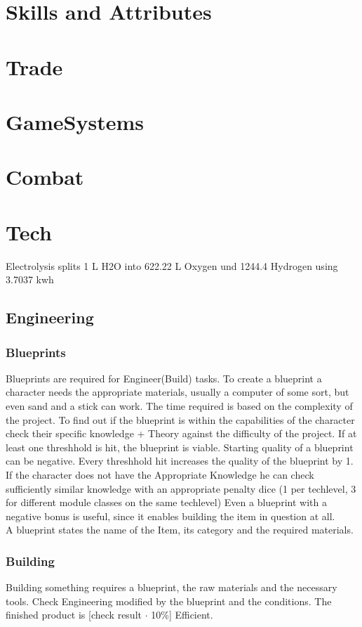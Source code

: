 \chapter{Skills and Attributes}\label{ch:skillsandattributes}



\chapter{Trade}\label{ch:trade}



\chapter{GameSystems}\label{ch:gamesystems}



\chapter{Combat}\label{ch:combat}


\chapter{Tech}\label{ch:tech}
Electrolysis splits 1 L H2O into 622.22 L Oxygen und 1244.4 Hydrogen using 3.7037 kwh\\
\section{Engineering}\label{sec:engineering}
\subsection{Blueprints}\label{subsec:blueprints}
Blueprints are required for Engineer(Build) tasks.
To create a blueprint a character needs the appropriate materials, usually a computer of some sort, but even sand and a
stick can work.
The time required is based on the complexity of the project.
To find out if the blueprint is within the capabilities of the character check their specific knowledge + Theory
against the difficulty of the project.
If at least one threshhold is hit, the blueprint is viable.
Starting quality of a blueprint can be negative.
Every threshhold hit increases the quality of the blueprint by 1.
If the character does not have the Appropriate Knowledge he can check sufficiently similar knowledge with
an appropriate penalty dice (1 per techlevel, 3 for different module classes on the same techlevel)
Even a blueprint with a negative bonus is useful, since it enables building the item in question at all.\\
A blueprint states the name of the Item, its category and the required materials.

\subsection{Building}\label{subsec:building}
Building something requires a blueprint, the raw materials and the necessary tools.
Check Engineering modified by the blueprint and the conditions.
The finished product is [check result \(\cdot\) 10\%] Efficient.
